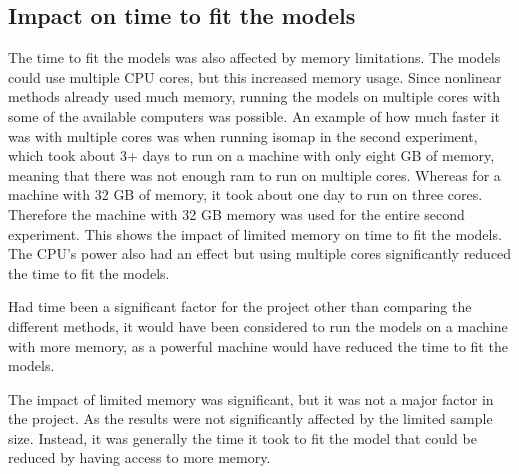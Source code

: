 \subsection{Impact on time to fit the models}\label{subsec:impact_on_time_to_fit_the_models}
The time to fit the models was also affected by memory limitations. The models could use multiple CPU cores, but this increased memory usage. Since nonlinear methods already used much memory, running the models on multiple cores with some of the available computers was possible. An example of how much faster it was with multiple cores was when running \gls{isomap} in the second experiment, which took about 3+ days to run on a machine with only eight GB of memory, meaning that there was not enough ram to run on multiple cores. Whereas for a machine with 32 GB of memory, it took about one day to run on three cores. Therefore the machine with 32 GB memory was used for the entire second experiment. This shows the impact of limited memory on time to fit the models. The CPU's power also had an effect but using multiple cores significantly reduced the time to fit the models.

Had time been a significant factor for the project other than comparing the different methods, it would have been considered to run the models on a machine with more memory, as a powerful machine would have reduced the time to fit the models.

The impact of limited memory was significant, but it was not a major factor in the project. As the results were not significantly affected by the limited sample size. Instead, it was generally the time it took to fit the model that could be reduced by having access to more memory.


